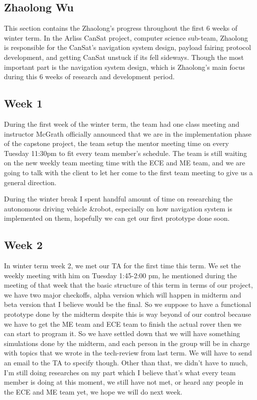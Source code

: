 \documentclass[10pt,letterpaper,onecolumn,draftclsnofoot,journal]{IEEEtran}
\begin{document}
\subsection{Zhaolong Wu}
This section contains the Zhaolong's progress throughout the first 6 weeks of winter term. In the Arliss CanSat project, computer science sub-team, Zhaolong is responsible for the CanSat's navigation system design, payload fairing protocol development, and getting CanSat unstuck if its fell sideways. Though the most important part is the navigation system design, which is Zhaolong's main focus during this 6 weeks of research and development period.

\subsection{Week 1}
During the first week of the winter term, the team had one class meeting and instructor McGrath officially announced that we are in the implementation phase of the capstone project, the team setup the mentor meeting time on every Tuesday 11:30pm to fit every team member's schedule. The team is still waiting on the new weekly team meeting time with the ECE and ME team, and we are going to talk with the client to let her come to the first team meeting to give us a general direction. 

During the winter break I spent handful amount of time on researching the autonomous driving vehicle \&robot, especially on how navigation system is implemented on them, hopefully we can get our first prototype done soon.

\subsection{Week 2}
In winter term week 2, we met our TA for the first time this term. We set the weekly meeting with him on Tuesday 1:45-2:00 pm, he mentioned during the meeting of that week that the basic structure of this term in terms of our project, we have two major checkoffs, alpha version which will happen in midterm and beta version that I believe would be the final. So we suppose to have a functional prototype done by the midterm despite this is way beyond of our control because we have to get the ME team and ECE team to finish the actual rover then we can start to program it. So we have settled down that we will have something simulations done by the midterm, and each person in the group will be in charge with topics that we wrote in the tech-review from last term. We will have to send an email to the TA to specify though.
Other than that, we didn't have to much, I'm still doing researches on my part which I believe that's what every team member is doing at this moment, we still have not met, or heard any people in the ECE and ME team yet, we hope we will do next week.
\end{document}
